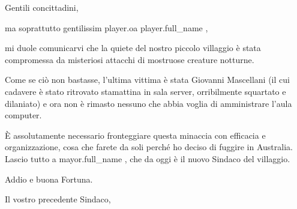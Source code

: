 \documentclass{letter}
\date{16 marzo 2014}
\begin{document}
\begin{letter}{}
\opening{Gentili concittadini,}

ma soprattutto gentilissim{{ player.oa }} {{ player.full_name }},

mi duole comunicarvi che la quiete del nostro piccolo villaggio è stata compromessa da misteriosi attacchi di mostruose creature notturne.

Come se ciò non bastasse, l'ultima vittima è stata Giovanni Mascellani (il cui cadavere è stato ritrovato stamattina in sala server, orribilmente squartato e dilaniato) e ora non è rimasto nessuno che abbia voglia di amministrare l'aula computer.

È assolutamente necessario fronteggiare questa minaccia con efficacia e organizzazione, cosa che farete da soli perché ho deciso di fuggire in Australia.
Lascio tutto a {{ mayor.full_name }}, che da oggi è il nuovo Sindaco del villaggio.

Addio e buona Fortuna.

\closing{Il vostro precedente Sindaco,}

\end{letter}
\end{document}

